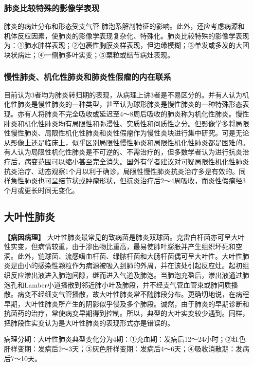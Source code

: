 \subsubsection{肺炎比较特殊的影像学表现}

肺炎的病灶分布和形态受支气管-肺泡系解剖特征的影响。此外，还应考虑病源和机体反应因素，使肺炎的影像学表现复杂化、特殊化。肺炎比较特殊的影像学表现为：①肺水肿样表现；②包裹性胸膜炎样表现，但边缘模糊；③单发或多发的大团块状病灶；④一侧肺多叶实变；⑤粟粒或结节病灶表现。

\subsubsection{慢性肺炎、机化性肺炎和肺炎性假瘤的内在联系}

目前认为3者均为肺炎转归期的表现，从病理上讲3者是不易区分的。并有人认为机化性肺炎是慢性肺炎的一种类型，甚至认为球形肺炎是慢性肺炎的一种特殊形态表现。亦有人将肺炎不完全吸收或延迟至4～8周后吸收的肺炎称为机化性肺炎。慢性肺炎和机化性肺炎均有局限性和弥漫性、实质性和间质性之分。但影像学多将局限性慢性肺炎、局限性机化性肺炎和炎性假瘤作为慢性炎块进行集中研究。可是无论从影像上还是临床上，似乎区别局限性慢性肺炎和局限性机化性肺炎都是困难的。有人认为局限性机化性肺炎是不可逆的、不需治疗的，但多数学者认为进行抗炎治疗后，病变范围可以缩小甚至完全消失。国外有学者建议对可疑局限性机化性肺炎抗炎治疗、动态观察1个月以利于确诊，局限性慢性肺炎抗炎治疗多是有效的。同样急性肺炎也可呈结节状或肿瘤形状，但抗炎治疗后2～4周吸收，而炎性假瘤经3个月或更长时间无变化。

\subsection{大叶性肺炎}

\textbf{【病因病理】}
大叶性肺炎最常见的致病菌是肺炎双球菌。克雷白杆菌亦可呈大叶性实变，但病情较重，由于渗出物比重高，最易使肺叶膨胀并产生组织坏死和空洞。此外，链球菌、流感嗜血杆菌、绿脓杆菌和大肠杆菌偶可呈大叶性。大叶性肺炎是由小的感染性颗粒作为病源被吸入到肺的外周，并在该处引起反应灶。起初组织反应渗出液进入肺泡间隙，继而进入气道及肺泡。当肺泡充盈后，渗出液通过肺泡孔和Lamber小道播散到邻近肺小叶及肺段，并不经支气管血管束或肺间质播散。病变不经细支气管播散，故大叶性肺炎常不随肺段分布。更确切地说，在病程早期，大叶性肺炎所产生的阴影似乎侵及多个肺段。诚然，由于肺炎的早期诊断和抗菌药的治疗，常使病变早期得到控制。所以，典型的大叶实变较少遇到。同样，把肺段性实变认为是大叶性肺炎的表现形式亦是错误的。

病理分期：大叶性肺炎典型变化分为4期：①充血期：发病后12～24小时；②红色肝样变期：发病后2～3天；③灰色肝样变期：发病后4～6天；④吸收消散期：发病后7～10天。

